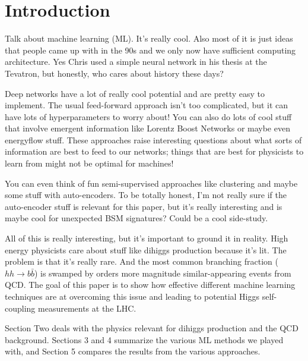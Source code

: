 \section{Introduction}
\label{sec:intro}

Talk about machine learning (ML). It's really cool. Also most of it is just ideas that people came up with in the 90s and we only now have sufficient computing architecture. Yes Chris used a simple neural network in his thesis at the Tevatron, but honestly, who cares about history these days?

Deep networks have a lot of really cool potential and are pretty easy to implement. The usual feed-forward approach isn't too complicated, but it can have lots of hyperparameters to worry about! You can also do lots of cool stuff that involve emergent information like Lorentz Boost Networks or maybe even energyflow stuff. These approaches raise interesting questions about what sorts of information are best to feed to our networks; things that are best for physicists to learn from might not be optimal for machines!

You can even think of fun semi-supervised approaches like clustering and maybe some stuff with auto-encoders. To be totally honest, I'm not really sure if the auto-encoder stuff is relevant for this paper, but it's really interesting and is maybe cool for unexpected BSM signatures? Could be a cool side-study.

All of this is really interesting, but it's important to ground it in reality. High energy physicists care about stuff like dihiggs production because it's lit. The problem is that it's really rare. And the most common branching fraction ($hh\rightarrow b\bar{b}$) is swamped by orders more magnitude similar-appearing events from QCD. The goal of this paper is to show how effective different machine learning techniques are at overcoming this issue and leading to potential Higgs self-coupling measurements at the LHC.

Section Two deals with the physics relevant for dihiggs production and the QCD background. Sections 3 and 4 summarize the various ML methods we played with, and Section 5 compares the results from the various approaches.
